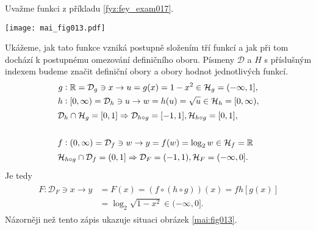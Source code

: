 \begin{mdframed}[style=mdexam]
  \begin{example}\label{MAI:exam025}
    Uvažme funkci z příkladu \ref{fyz:fey_exam017}. 
    
    {\centering
    \captionsetup{type=figure}
    \texttt{[image: mai\_fig013.pdf]}
    \par}
    
    Ukážeme, jak tato funkce vzniká postupně složením tří funkcí a jak při tom dochází k postupnému 
    omezování definičního oboru. Písmeny \(\mathcal{D}\) a \(H\) s příslušným indexem budeme značit 
    definiční obory a obory hodnot jednotlivých funkcí.
    \begin{gather*}
      \begin{align*}
        g&:  \mathbb{R} =\mathcal{D}_g\ni x\rightarrow u=g(x) = 1- x^2  \in\mathcal{H}_g=(-\infty,1], \\
        h&: [0,\infty)=\mathcal{D}_h\ni u\rightarrow w=h(u) = \sqrt{u}\in\mathcal{H}_h=[0,\infty),  \\
       \shortintertext{\(\mathcal{D}_h\cap\mathcal{H}_g = [0,1]\Rightarrow\mathcal{D}_{h\circ g}=[-1,1], 
                       \mathcal{H}_{h\circ g} = [0,1],\)}                                    \\
       f&:(0,\infty)=\mathcal{D}_f\ni w \rightarrow y=f(w)=\log_2w\in\mathcal{H}_f=\mathbb{R}  \\
       \shortintertext{\(\mathcal{H}_{h\circ g}\cap\mathcal{D}_f = (0,1] 
                       \Rightarrow\mathcal{D}_F=(-1,1),\mathcal{H}_F=(-\infty,0].\)} 
      \end{align*}
    \end{gather*}
    Je tedy
    \begin{gather*}
      \begin{align*}
        F:\mathcal{D}_F\ni x\rightarrow 
        y&=F(x)=(f\circ(h\circ g))(x) = f{h[g(x)]}          \\
        &= \log_2\sqrt{1-x^2}\in(-\infty,0].
      \end{align*}
    \end{gather*}
    Názorněji než tento zápis ukazuje situaci obrázek \ref{mai:fig013}.
  \end{example}
\end{mdframed}